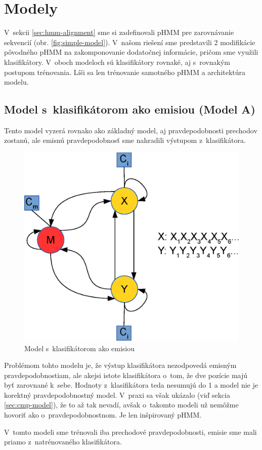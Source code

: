 \chapter{Modely}
\label{chap:models}

V~sekcii \ref{sec:hmm-alignment} sme si zadefinovali pHMM pre zarovnávanie sekvencií (obr. \ref{fig:simple-model}).
V~našom riešení sme predstavili 2 modifikácie pôvodného pHMM na zakomponovanie dodatočnej informácie, pričom sme využili klasifikátory. V~oboch modeloch sú klasifikátory rovnaké, aj s~rovnakým postupom trénovania. Líši sa len trénovanie samotného pHMM a architektúra modelu.

\section[Model s~klasifikátorom ako emisiou]{Model s~klasifikátorom ako emisiou (Model A)}
\label{sec:model-clf}

Tento model vyzerá rovnako ako základný model, aj pravdepodobnosti prechodov zostanú, ale emisnú pravdepodobnosť sme nahradili výstupom z~klasifikátora.

\begin{figure}[htp]
    \centering
    \includegraphics[width=.5\textwidth]{images/model_clf}
    \caption{Model s~klasifikátorom ako emisiou}
\end{figure}

Problémom tohto modelu je, že výstup klasifikátora nezodpovedá emisným pravdepodobnostiam, ale akejsi istote klasifikátora o~tom, že dve pozície majú byť zarovnané k~sebe. Hodnoty z~klasifikátora teda nesumujú do 1 a model nie je korektný pravdepodobnostný model. V~praxi sa však ukázalo (viď sekcia \ref{sec:cmp-model}), že to až tak nevadí, avšak o~takomto modeli už nemôžme hovoriť ako o~pravdepodobnostnom. Je len inšpirovaný pHMM.

V~tomto modeli sme trénovali iba prechodové pravdepodobnosti, emisie sme mali priamo z~natrénovaného klasifikátora.

